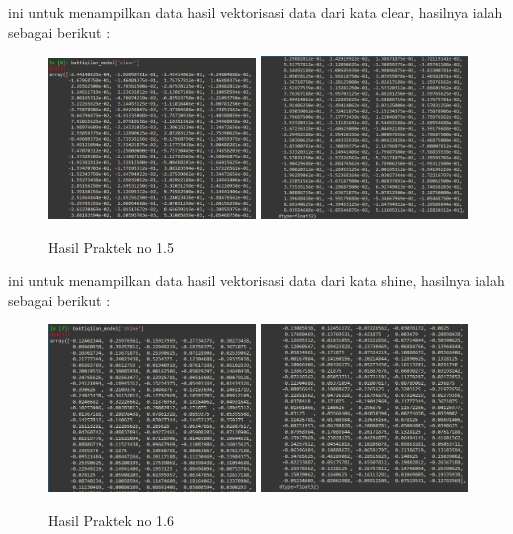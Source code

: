 
ini untuk menampilkan data hasil vektorisasi data dari kata clear, hasilnya ialah sebagai berikut :
\begin{figure}[H]
	\centering
	\includegraphics[width=5.5cm]{figures/1174083/figures5/16.png}
	\includegraphics[width=5.5cm]{figures/1174083/figures5/17.png}
	\caption{Hasil Praktek no 1.5}
\end{figure}


ini untuk menampilkan data hasil vektorisasi data dari kata shine, hasilnya ialah sebagai berikut :
\begin{figure}[H]
	\centering
	\includegraphics[width=5.5cm]{figures/1174083/figures5/18.png}
	\includegraphics[width=5.5cm]{figures/1174083/figures5/19.png}
	\caption{Hasil Praktek no 1.6}
\end{figure}

